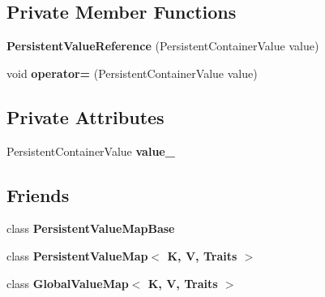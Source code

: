 \subsection*{Private Member Functions}
\begin{DoxyCompactItemize}
\item 
{\bfseries Persistent\+Value\+Reference} (Persistent\+Container\+Value value)\hypertarget{classv8_1_1_persistent_value_map_base_1_1_persistent_value_reference_a0d7469174626cee27afd20846138498d}{}\label{classv8_1_1_persistent_value_map_base_1_1_persistent_value_reference_a0d7469174626cee27afd20846138498d}

\item 
void {\bfseries operator=} (Persistent\+Container\+Value value)\hypertarget{classv8_1_1_persistent_value_map_base_1_1_persistent_value_reference_a521345ca3a629265494faf81d0630750}{}\label{classv8_1_1_persistent_value_map_base_1_1_persistent_value_reference_a521345ca3a629265494faf81d0630750}

\end{DoxyCompactItemize}
\subsection*{Private Attributes}
\begin{DoxyCompactItemize}
\item 
Persistent\+Container\+Value {\bfseries value\+\_\+}\hypertarget{classv8_1_1_persistent_value_map_base_1_1_persistent_value_reference_adb5f76de4ed5468b9cce738625a7e3e0}{}\label{classv8_1_1_persistent_value_map_base_1_1_persistent_value_reference_adb5f76de4ed5468b9cce738625a7e3e0}

\end{DoxyCompactItemize}
\subsection*{Friends}
\begin{DoxyCompactItemize}
\item 
class {\bfseries Persistent\+Value\+Map\+Base}\hypertarget{classv8_1_1_persistent_value_map_base_1_1_persistent_value_reference_ae5cccd63ef6d94c509ad8b6970d4017d}{}\label{classv8_1_1_persistent_value_map_base_1_1_persistent_value_reference_ae5cccd63ef6d94c509ad8b6970d4017d}

\item 
class {\bfseries Persistent\+Value\+Map$<$ K, V, Traits $>$}\hypertarget{classv8_1_1_persistent_value_map_base_1_1_persistent_value_reference_a22fcaa9f3ba179f3bb566eda5b93790d}{}\label{classv8_1_1_persistent_value_map_base_1_1_persistent_value_reference_a22fcaa9f3ba179f3bb566eda5b93790d}

\item 
class {\bfseries Global\+Value\+Map$<$ K, V, Traits $>$}\hypertarget{classv8_1_1_persistent_value_map_base_1_1_persistent_value_reference_a41811cde55d1ef227d1ba28778d95d08}{}\label{classv8_1_1_persistent_value_map_base_1_1_persistent_value_reference_a41811cde55d1ef227d1ba28778d95d08}

\end{DoxyCompactItemize}


